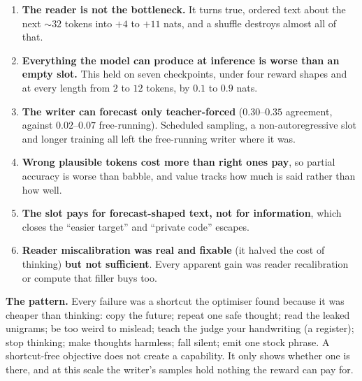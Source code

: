 \documentclass[11pt]{article}
\begin{document}
\begin{enumerate}\setlength{\itemsep}{2pt}
\item \textbf{The reader is not the bottleneck.} It turns true, ordered text about the next ${\sim}32$ tokens into $+4$ to $+11$ nats, and a shuffle destroys almost all of that.
\item \textbf{Everything the model can produce at inference is worse than an empty slot.} This held on seven checkpoints, under four reward shapes and at every length from $2$ to $12$ tokens, by $0.1$ to $0.9$ nats.
\item \textbf{The writer can forecast only teacher-forced} ($0.30$--$0.35$ agreement, against $0.02$--$0.07$ free-running). Scheduled sampling, a non-autoregressive slot and longer training all left the free-running writer where it was.
\item \textbf{Wrong plausible tokens cost more than right ones pay}, so partial accuracy is worse than babble, and value tracks how much is said rather than how well.
\item \textbf{The slot pays for forecast-shaped text, not for information}, which closes the ``easier target'' and ``private code'' escapes.
\item \textbf{Reader miscalibration was real and fixable} (it halved the cost of thinking) \textbf{but not sufficient}. Every apparent gain was reader recalibration or compute that filler buys too.
\end{enumerate}

\textbf{The pattern.} Every failure was a shortcut the optimiser found because it was cheaper than thinking: copy the future; repeat one safe thought; read the leaked unigrams; be too weird to mislead; teach the judge your handwriting (a register); stop thinking; make thoughts harmless; fall silent; emit one stock phrase. A shortcut-free objective does not create a capability. It only shows whether one is there, and at this scale the writer's samples hold nothing the reward can pay for.

\end{document}
